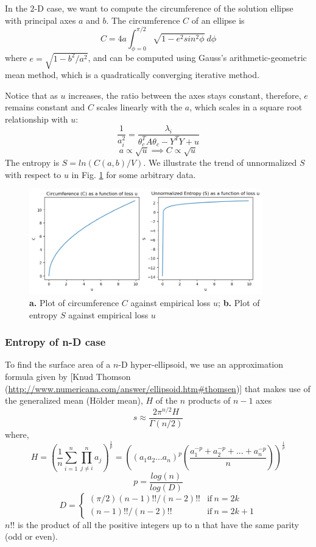 \documentclass{article}
\begin{document}
In the $2$-D case, we want to compute the circumference of the solution ellipse with principal axes $a$ and $b$. The circumference $C$ of an ellipse is 
\[
C = 4a \int_{\phi=0}^{\pi/2} \sqrt{1-e^2sin^2\phi}\ d\phi
\]
where $e=\sqrt{1-b^2/a^2}$, and can be computed using Gauss's arithmetic-geometric mean method, which is a quadratically converging iterative method.


Notice that as $u$ increases, the ratio between the axes stays constant, therefore, $e$ remains constant and $C$ scales linearly with the $a$, which scales in a square root relationship with $u$:
\[
\frac{1}{a_i^2} = \frac{\lambda_i}{\theta_c^T A \theta_c - Y^TY + u}
\]
\[
a \propto \sqrt{u} \implies C \propto \sqrt{u}
\]
The entropy is $S = ln(C(a, b)/V)$. We illustrate the trend of unnormalized $S$ with respect to $u$ in Fig. \ref{S_against_u} for some arbitrary data.

\begin{figure}[!h]%
\centering
\includegraphics[width=0.9\textwidth]{figures/S_against_u.png}
\caption{\textbf{a.} Plot of circumference $C$ against empirical loss $u$; \textbf{b.} Plot of entropy $S$ against empirical loss $u$}\label{S_against_u}
\end{figure}

\subsubsection{Entropy of n-D case}
To find the surface area of a $n$-D hyper-ellipsoid, we use an approximation formula given by [Knud Thomson (\url{http://www.numericana.com/answer/ellipsoid.htm#thomsen})] that makes use of the generalized mean (Hölder mean), $H$ of the $n$ products of $n-1$  axes
\[
s \approx \frac{2\pi^{n/2}H}{\Gamma(n/2)}
\]
where,  
\[
H =\left(\frac{1}{n} \sum_{i=1}^n \prod_{j \neq i}^n a_j \right)^{\frac{1}{p}} = \left((a_1 a_2 ... a_n)^p \left(\frac{a_1^{-p} + a_2^{-p} + ... + a_n^{-p}}{n} \right)\right)^{\frac{1}{p}}
\]
\[
p = \frac{log(n)}{log(D)}
\]
\[
D = 
\begin{cases}
  (\pi/2)(n-1)!!/(n-2)!! & \text{if}\ n=2k \\
  (n-1)!!/(n-2)!! & \text{if}\ n=2k+1
\end{cases}
\]
$n!!$ is the product of all the positive integers up to n that have the same parity (odd or even).
\end{document}
